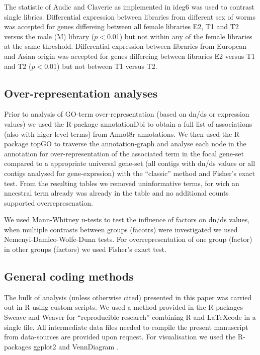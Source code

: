 \documentclass[10pt]{bmc_article}
\newenvironment{bmcformat}{\begin{raggedright}\baselineskip20pt\sloppy\setboolean{publ}{false}}{\end{raggedright}\baselineskip20pt\sloppy}
\begin{document}
\begin{bmcformat}

The statistic of Audic and Claverie \cite{pmid9331369} as implemented
in ideg6 \cite{pmid12429865} was used to contrast single
libries. Differential expression between libraries from different sex
of worms was accepted for genes differeing between all female
libraries E2, T1 and T2 versus the male (M) library ($p<$0.01) but not
within any of the female libraries at the same threshold. Differential
expression between libraries from European and Asian origin was
accepted for genes differeing between libraries E2 versus T1 and T2
($p<$0.01) but not between T1 versus T2.

\subsection*{Over-representation analyses}

Prior to analysis of GO-term over-representation (based on dn/ds or
expression values) we used the R-package annotationDbi
\cite{AnnotationDbi} to obtain a full list of associations (also with
higer-level terms) from Annot8r-annotations. We then used the
R-package topGO \cite{topGO} to traverse the annotation-graph and
analyse each node in the annotation for over-representation of the
associated term in the focal gene-set compared to a appropriate
universal gene-set (all contigs with dn/ds values or all contigs
analysed for gene-exprssion) with the ``classic'' method and Fisher's
exact test. From the resulting tables we removed uninformative terms,
for wich an nncestral term already was already in the table and no
additional counts supported overrepresenation.

We used Mann-Whitney u-tests to test the influence of factors on dn/ds
values, when multiple contrasts between groups (facotrs) were
investigated we used Nemenyi-Damico-Wolfe-Dunn tests. For
overrepresentation of one group (factor) in other groups (factors) we
used Fisher's exact test.

\subsection*{General coding methods}

The bulk of analysis (unless otherwise cited) presented in this paper
was carried out in R \cite{R_project} using custom scripts. We used a
method provided in the R-packages Sweave
\cite{lmucs-papers:Leisch:2002} and Weaver \cite{weaver} for
``reproducible research'' combining R and \LaTeX code in a single
file. All intermediate data files needed to compile the present
manuscript from data-sources are provided upon request. For
visualisation we used the R-packages ggplot2 \cite{ggplot-book} and
VennDiagram \cite{pmid21269502}.



\end{bmcformat}
\end{document}
